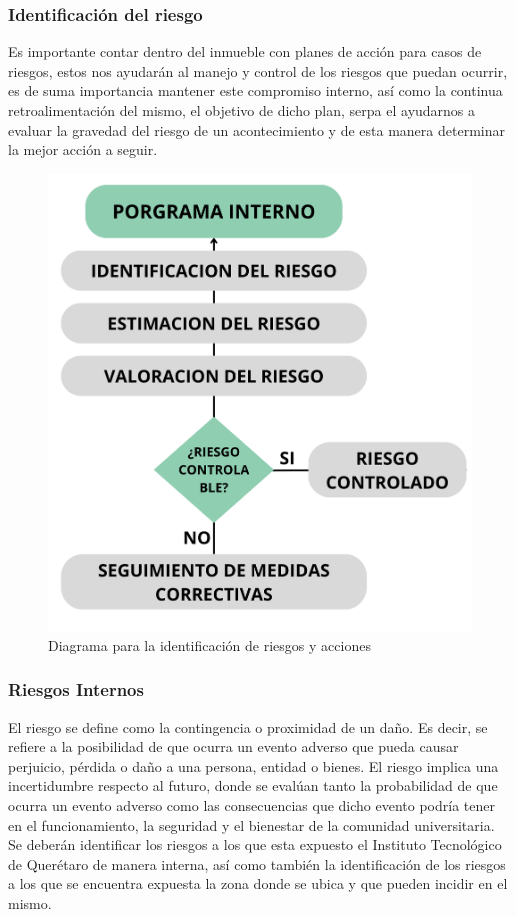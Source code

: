     \subsubsection{Identificación del riesgo}
    Es importante contar dentro del inmueble con planes de acción para casos de riesgos, estos nos ayudarán al manejo y control de los riesgos que puedan ocurrir, es de suma importancia mantener este compromiso interno, así como la continua retroalimentación del mismo, el objetivo de dicho plan, serpa el ayudarnos a evaluar la gravedad del riesgo de un acontecimiento y de esta manera determinar la mejor acción a seguir.
    
    \begin{figure}[H]
        \centering
        \includegraphics[scale=0.15]{34/img/diagrama.png}
        \caption{Diagrama para la identificación de riesgos y acciones}
    \end{figure}
    
    \subsubsection{ Riesgos Internos}
    El riesgo se define como la contingencia o proximidad de un daño.\cite{RAE} Es decir, se refiere a la posibilidad de que ocurra un evento adverso que pueda causar perjuicio, pérdida o daño a una persona, entidad o bienes. El riesgo implica una incertidumbre respecto al futuro, donde se evalúan tanto la probabilidad de que ocurra un evento adverso como las consecuencias que dicho evento podría tener en el funcionamiento, la seguridad y el bienestar de la comunidad universitaria.
    Se deberán identificar los riesgos a los que esta expuesto el Instituto Tecnológico de Querétaro de manera interna, así como también la identificación de los riesgos a los que se encuentra expuesta la zona donde se ubica y que pueden incidir en el mismo.
    
